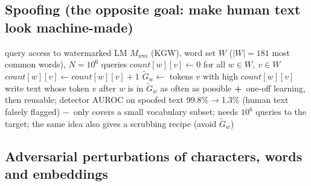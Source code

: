 \documentclass[10pt,a4paper,twocolumn]{article}
\newcommand{\pro}[1]{\Statex\textcolor{proc}{\textbf{+}\ #1}}
\newcommand{\con}[1]{\Statex\textcolor{conc}{\textbf{$-$}\ #1}}
\begin{document}
\subsection*{Spoofing (the opposite goal: make human text look machine-made)}

\begin{algorithm}[H]\small
\caption{Watermark spoofing by learning a proxy green list (Sadasivan et al.\ 2023)}
\begin{algorithmic}[1]
\Require query access to watermarked LM $M_{wm}$ (KGW), word set $W$ ($|W|=181$ most common words), $N=10^6$ queries
 \State $\mathit{count}[w][v]\gets0$ for all $w\in W,\ v\in W$
   \State $\mathit{count}[w][v]\gets\mathit{count}[w][v]+1$ \EndFor
 \EndFor
 \State $\tilde G_w\gets$ tokens $v$ with high $\mathit{count}[w][v]$ 
\EndProcedure
{} \State write text whose token $v$ after $w$ is in $\tilde G_w$ as often as possible \EndProcedure
\pro{one-off learning, then reusable; detector AUROC on spoofed text 99.8\%$\to$1.3\% (human text falsely flagged)}
\con{only covers a small vocabulary subset; needs $10^6$ queries to the target; the same idea also gives a scrubbing recipe (avoid $\tilde G_w$)}
\end{algorithmic}
\end{algorithm}

\subsection*{Adversarial perturbations of characters, words and embeddings}
\end{document}
